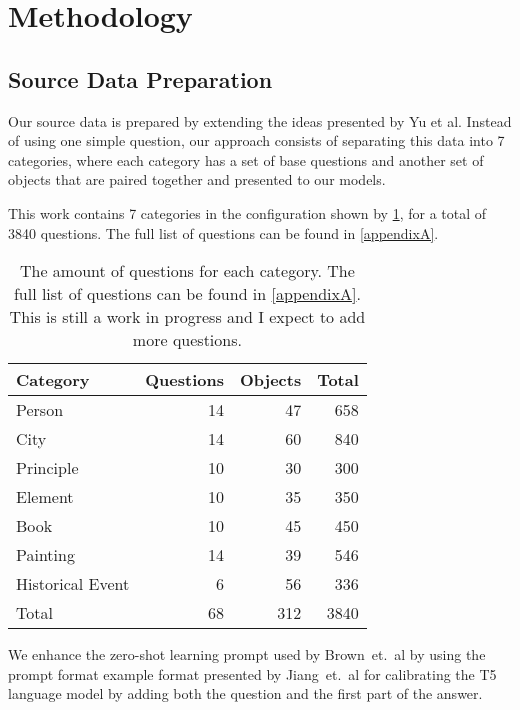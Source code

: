 \section{Methodology}

\newcommand{\cats}{7}
\newcommand{\baseqs}{68}
\newcommand{\things}{312}
\newcommand{\qs}{3840}

\subsection{Source Data Preparation}

Our source data is prepared by extending the ideas presented by Yu et al\cite{factual_recall}.
Instead of using one simple question, our approach consists of separating this data into \cats{} categories, where each category has a set of base questions and another set of objects that are paired together and presented to our models.

This work contains \cats{} categories in the configuration shown by \cref{categories_numbers}, for a total of \qs{} questions.
The full list of questions can be found in \cref{appendixA}.

\begin{table}[h]
	\centering
	\footnotesize
	\begin{tabular}{l | r r r}
		\toprule
			\bfseries Category & \bfseries Questions & \bfseries Objects & \bfseries Total \\
		\midrule
			Person           & 14 &  47 &  658 \\
			City             & 14 &  60 &  840 \\
			Principle        & 10 &  30 &  300 \\
			Element          & 10 &  35 &  350 \\
			Book             & 10 &  45 &  450 \\
			Painting         & 14 &  39 &  546 \\
			Historical Event & 6  &  56 &  336 \\
		\midrule
			Total & \baseqs{} & \things{} & \qs{} \\
		\bottomrule
	\end{tabular}
	\caption{The amount of questions for each category. The full list of questions can be found in \cref{appendixA}. This is still a work in progress and I expect to add more questions.}
	\label{categories_numbers}
\end{table}

We enhance the zero-shot learning prompt used by Brown~et.~al\cite{fewshotlearners} by using the prompt format example format presented by Jiang~et.~al\cite{how_can_we_know} for calibrating the T5 language model by adding both the question and the first part of the answer.

